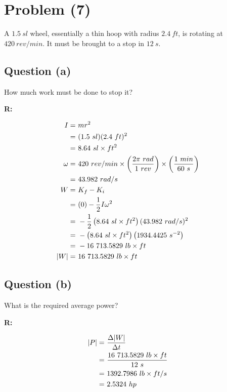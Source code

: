 \section{Problem (7)}
	A $1.5 \ sl$ wheel, essentially a thin hoop with radius $2.4 \ ft$, is rotating at $420 \ rev/min$. It must be brought to a stop in $12 \ s$.

	\subsection{Question (a)}

		How much work must be done to stop it?

		\textbf{R:}

		\begin{align}
			I = \ &mr^{2}& \notag \\
			= \ &(1.5 \ sl)(2.4 \ ft)^{2}& \notag \\
			= \ &8.64 \ sl \times ft^{2}& \notag \\
			\omega = \ &420 \ rev/min
			\times \left( \frac{2 \pi \ rad}{1 \ rev} \right)
			\times \left( \frac{1 \ min}{60 \ s} \right)& \notag \\
			= \ &43.982 \ rad/s& \notag \\
			W = \ &K_{f} - K_{i}& \notag \\
			= \ &(0) - \frac{1}{2}I \omega^{2}& \notag \\
			= \ &- \frac{1}{2}\left( 8.64 \ sl \times ft^{2} \right) (43.982 \ rad/s)^{2}& \notag \\
			= \ &- \left(8.64 \ sl \times ft^{2}\right)\left(1934.4425 \ s^{-2}\right)& \notag \\
			= \ &- 16 \ 713.5829 \ lb \times ft& \notag \\
			|W| = \ &16 \ 713.5829 \ lb \times ft&
		\end{align}

	\subsection{Question (b)}

		What is the required average power?

		\textbf{R:}

		\begin{align}
			|P| = \ &\frac{\Delta |W|}{\Delta t}& \notag \\
			= \ &\frac{16 \ 713.5829 \ lb \times ft}{12 \ s}& \notag \\
			= \ &1392.7986 \ lb \times ft/s& \notag \\
			= \ &2.5324 \ hp&
		\end{align}
